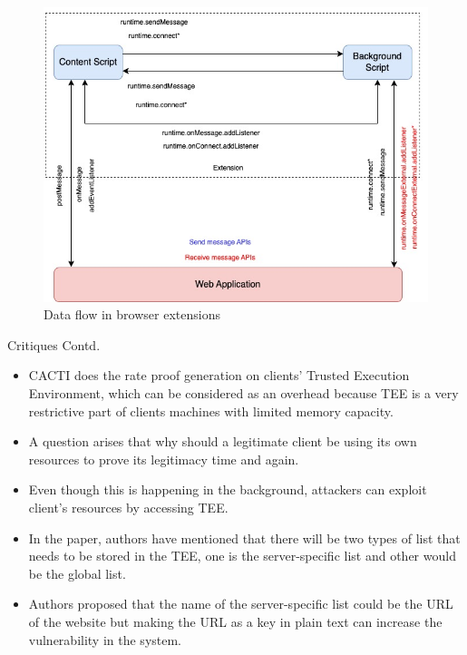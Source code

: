 \documentclass{beamer}
\begin{document}
\begin{frame}
	\begin{figure}
		\centering
		\includegraphics[scale=0.4]{img4.jpg}
		\caption{Data flow in browser extensions}
		\label{img3}
	\end{figure}
\end{frame}

\begin{frame}{Critiques Contd.}
	\begin{itemize}
		\item CACTI does the rate proof generation on clients' Trusted Execution Environment, which can be considered as an overhead because TEE is a very restrictive part of clients machines with limited memory capacity.
		\item A question arises that why should a legitimate client be using its own resources to prove its legitimacy time and again.
		\item Even though this is happening in the background, attackers can exploit client’s resources by accessing TEE.
		\item In the paper, authors have mentioned that there will be two types of list that needs to be stored in the TEE, one is the server-specific list and other would be the global list.
		\item Authors proposed that the name of the server-specific list could be the URL of the website but making the URL as a key in plain text can increase the vulnerability in the system.
	\end{itemize}
\end{frame}
\end{document}
